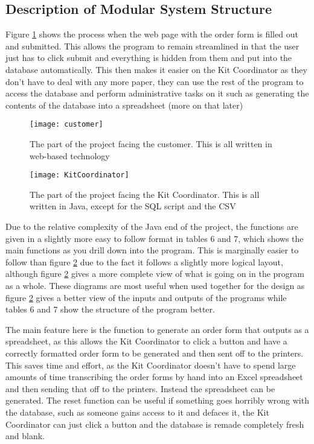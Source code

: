 \documentclass[
11pt, %
a4paper, %
oneside, %
headinclude,footinclude, %
BCOR5mm, %
]{scrartcl}
\begin{document}
\subsection{Description of Modular System Structure}
Figure \ref{Customer} shows the process when the web page with the order form is filled out and submitted. This allows the program to remain streamlined in that the user just has to click submit and everything is hidden from them and put into the database automatically. This then makes it easier on the Kit Coordinator as they don't have to deal with any more paper, they can use the rest of the program to access the database and perform administrative tasks on it such as generating the contents of the database into a spreadsheet (more on that later)
\begin{figure}[H]
\centering
\texttt{[image: customer]}
\caption{The part of the project facing the customer. This is all written in web-based technology}
\label{Customer}
\end{figure}
\begin{figure}[H]
\centering
\texttt{[image: KitCoordinator]}
\caption{The part of the project facing the Kit Coordinator. This is all written in Java, except for the SQL script and the CSV}
\label{KitCoordinator}	
\end{figure}
Due to the relative complexity of the Java end of the project, the functions are given in a slightly more easy to follow format in tables 6 and 7, which shows the main functions as you drill down into the program. This is marginally easier to follow than figure \ref{KitCoordinator} due to the fact it follows a slightly more logical layout, although figure \ref{KitCoordinator} gives a more complete view of what is going on in the program as a whole. These diagrams are most useful when used together for the design as figure \ref{KitCoordinator} gives a better view of the inputs and outputs of the programs while tables 6 and 7 show the structure of the program better. \par The main feature here is the function to generate an order form that outputs as a spreadsheet, as this allows the Kit Coordinator to click a button and have a correctly formatted order form to be generated and then sent off to the printers. This saves time and effort, as the Kit Coordinator doesn't have to spend large amounts of time transcribing the order forms by hand into an Excel spreadsheet and then sending that off to the printers. Instead the spreadsheet can be generated. The reset function can be useful if something goes horribly wrong with the database, such as someone gains access to it and defaces it, the Kit Coordinator can just click a button and the database is remade completely fresh and blank.
\end{document}
